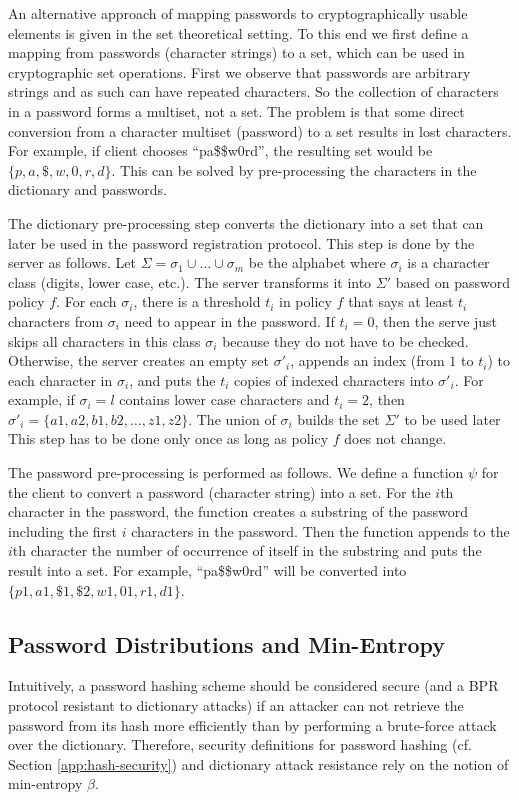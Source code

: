 An alternative approach of mapping passwords to cryptographically usable elements is given in the set theoretical setting.
To this end we first define a mapping from passwords (character strings) to a set, which can be used in cryptographic set operations.
First we observe that passwords are arbitrary strings and as such can have repeated characters. 
So the collection of characters in a password forms a multiset, not a set. 
The problem is that some direct conversion from a character multiset (password) to a set results in lost characters.
For example, if client chooses ``pa\$\$w0rd'', the resulting set would be $\{p,a,\$,w,0,r,d\}$.
This can be solved by pre-processing the characters in the dictionary and passwords.

The dictionary pre-processing step converts the dictionary into a set that can later be used in the password registration protocol. 
This step is done by the server as follows. 
Let $\Sigma=\sigma_1\cup\dots\cup \sigma_m$ be the alphabet where $\sigma_i$ is a character class (digits, lower case, etc.). 
The server transforms it into $\Sigma'$ based on password policy $f$. 
For each $\sigma_i$, there is a threshold $t_i$ in policy $f$ that says at least $t_i$ characters from $\sigma_i$ need to appear in the password. 
If $t_i = 0$, then the serve just skips all characters in this class $\sigma_i$ because they do not have to be checked. 
Otherwise, the server creates an empty set $\sigma'_i$, appends an index (from $1$ to $t_i$) to each character in $\sigma_i$, and puts the $t_i$ copies of indexed characters into $\sigma'_i$. 
For example, if $\sigma_i=l$ contains lower case characters and $t_i=2$, then $\sigma'_i=\{a1,a2,b1,b2,\ldots,z1,z2\}$. 
The union of $\sigma_i$ builds the set $\Sigma'$ to be used later 
This step has to be done only once as long as policy $f$ does not change.

The password pre-processing is performed as follows. 
We define a function $\psi$ for the client to convert a password (character string) into a set. 
For the $i$th character in the password, the function creates a substring of the password including the first $i$ characters in the password. 
Then the function appends to the $i$th character the number of occurrence of itself in the substring and puts the result into a set. 
For example, ``pa\$\$w0rd'' will be converted into $\{p1,a1,\$1,\$2,w1,01,r1,d1\}$. 
 


\subsection{Password Distributions and Min-Entropy} \label{sec:min-entropy}
Intuitively, a password hashing scheme should be considered secure (and a BPR protocol resistant to dictionary attacks) if an attacker can not retrieve the password from its hash more efficiently than by performing a brute-force attack over the dictionary. Therefore, security definitions for password hashing (cf. Section \ref{app:hash-security}) and dictionary attack resistance rely on the notion of min-entropy $\beta$.

